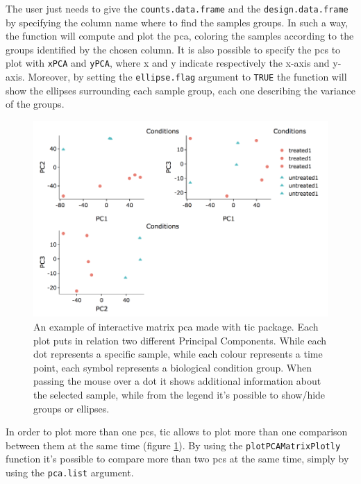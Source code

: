 The user just needs to give the \lstinline!counts.data.frame! and the \lstinline!design.data.frame! by specifying the column name where to find the samples groups.
In such a way, the function will compute and plot the \gls{pca}, coloring the samples according to the groups identified by the chosen column.
It is also possible to specify the \glspl{pc} to plot with \lstinline!xPCA! and \lstinline!yPCA!, where x and y indicate respectively the x-axis and y-axis.
Moreover, by setting the \lstinline!ellipse.flag! argument to \lstinline!TRUE!  the function will show the ellipses surrounding each sample group, each one describing the variance of the groups.

\begin{figure}[H]
\centering
\includegraphics[width=\textwidth, keepaspectratio]{img/ticorser/pcas.png}
\caption[ticorser pca]{An example of interactive matrix \gls{pca} made with \gls{tic} package. Each plot puts in relation two different Principal Components. While each dot represents a specific sample, while each colour represents a time point, each symbol represents a biological condition group. When passing the mouse over a dot it shows additional information about the selected sample, while from the legend it's possible to show/hide groups or ellipses.}
\label{fig:ticorserpcas}
\end{figure}

In order to plot more than one \glspl{pc}, \gls{tic} allows to plot more than one comparison between them at the same time (figure \ref{fig:ticorserpcas}).
By using the \lstinline!plotPCAMatrixPlotly! function it's possible to compare more than two \glspl{pc} at the same time, simply by using the \lstinline!pca.list! argument.


